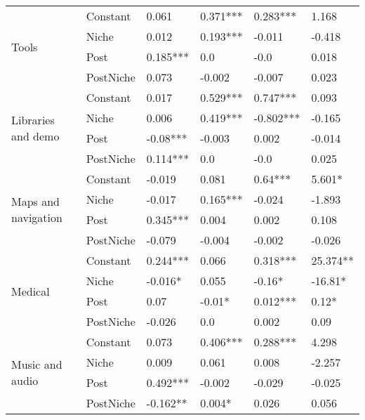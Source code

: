 \begin{longtable}[h!]{llllll}
\cline{1-6}
\multirow{4}{*}{Tools} & Constant &               0.061 &    0.371*** &   0.283*** &      1.168 \\
          & Niche &               0.012 &    0.193*** &     -0.011 &     -0.418 \\
          & Post &            0.185*** &         0.0 &       -0.0 &      0.018 \\
          & PostNiche &               0.073 &      -0.002 &     -0.007 &      0.023 \\
\cline{1-6}
\multirow{4}{*}{Libraries and demo} & Constant &               0.017 &    0.529*** &   0.747*** &      0.093 \\
          & Niche &               0.006 &    0.419*** &  -0.802*** &     -0.165 \\
          & Post &            -0.08*** &      -0.003 &      0.002 &     -0.014 \\
          & PostNiche &            0.114*** &         0.0 &       -0.0 &      0.025 \\
\cline{1-6}
\multirow{4}{*}{Maps and navigation} & Constant &              -0.019 &       0.081 &    0.64*** &     5.601* \\
          & Niche &              -0.017 &    0.165*** &     -0.024 &     -1.893 \\
          & Post &            0.345*** &       0.004 &      0.002 &      0.108 \\
          & PostNiche &              -0.079 &      -0.004 &     -0.002 &     -0.026 \\
\cline{1-6}
\multirow{4}{*}{Medical} & Constant &            0.244*** &       0.066 &   0.318*** &   25.374** \\
          & Niche &             -0.016* &       0.055 &     -0.16* &    -16.81* \\
          & Post &                0.07 &      -0.01* &   0.012*** &      0.12* \\
          & PostNiche &              -0.026 &         0.0 &      0.002 &       0.09 \\
\cline{1-6}
\multirow{4}{*}{Music and audio} & Constant &               0.073 &    0.406*** &   0.288*** &      4.298 \\
          & Niche &               0.009 &       0.061 &      0.008 &     -2.257 \\
          & Post &            0.492*** &      -0.002 &     -0.029 &     -0.025 \\
          & PostNiche &            -0.162** &      0.004* &      0.026 &      0.056 \\

\end{longtable}
